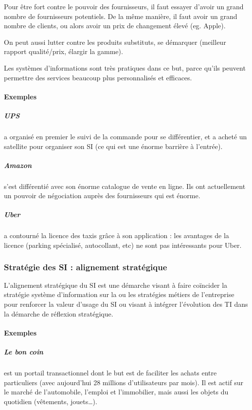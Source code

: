 \documentclass[10pt,a4paper,french]{article}
\begin{document}
Pour être fort contre le pouvoir des fournisseurs, il faut essayer d'avoir un grand nombre de fournisseurs potentiels. De la même manière, il faut avoir un grand nombre de clients, ou alors avoir un prix de changement élevé (eg. Apple).

On peut aussi lutter contre les produits substituts, se démarquer (meilleur rapport qualité/prix, élargir la gamme).

Les systèmes d'informations sont très pratiques dans ce but, parce qu'ils peuvent permettre des services beaucoup plus personnalisés et efficaces.

\paragraph{Exemples}
\subparagraph{UPS} a organisé en premier le suivi de la commande pour se différentier, et a acheté un satellite pour organiser son SI (ce qui est une énorme barrière à l'entrée).

\subparagraph{Amazon} s'est différentié avec son énorme catalogue de vente en ligne. Ils ont actuellement un pouvoir de négociation auprès des fournisseurs qui est énorme.

\subparagraph{Uber} a contourné la licence des taxis grâce à son application : les avantages de la licence (parking spécialisé, autocollant, etc) ne sont pas intéressants pour Uber.

\subsubsection{Stratégie des SI : alignement stratégique}

L'alignement stratégique du SI est une démarche visant à faire coïncider la stratégie système d'information sur la ou les stratégies métiers de l'entreprise pour renforcer la valeur d'usage du SI ou visant à intégrer l'évolution des TI dans la démarche de réflexion stratégique.

\paragraph{Exemples}

\subparagraph{Le bon coin} est un portail transactionnel dont le but est de faciliter les achats entre particuliers (avec aujourd'hui 28 millions d'utilisateurs par mois). Il est actif sur le marché de l'automobile, l'emploi et l'immobilier, mais aussi les objets du quotidien (vêtements, jouets\ldots).
\end{document}
